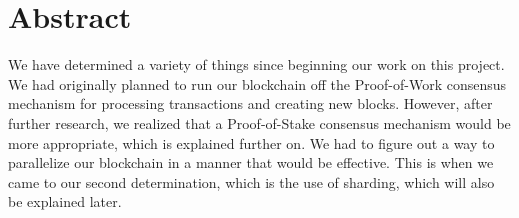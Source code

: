 \chapter*{Abstract}

We have determined a variety of things since beginning our work on this project. We had originally planned to run our blockchain off the Proof-of-Work consensus mechanism for processing transactions and creating new blocks. However, after further research, we realized that a Proof-of-Stake consensus mechanism would be more appropriate, which is explained further on. We had to figure out a way to parallelize our blockchain in a manner that would be effective. This is when we came to our second determination, which is the use of sharding, which will also be explained later. 